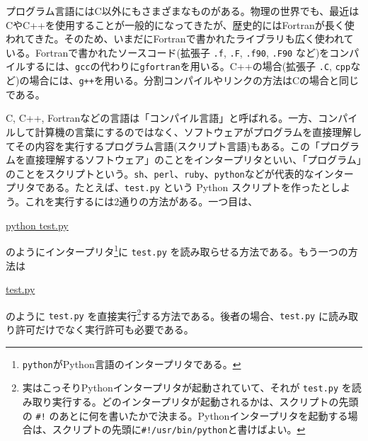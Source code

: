 プログラム言語にはC以外にもさまざまなものがある。物理の世界でも、最近はCやC++を使用することが一般的になってきたが、歴史的にはFortranが長く使われてきた。そのため、いまだにFortranで書かれたライブラリも広く使われている。Fortranで書かれたソースコード(拡張子 {\tt .f}, {\tt .F}, {\tt .f90}, {\tt .F90} など)をコンパイルするには、{\tt gcc}の代わりに{\tt gfortran}を用いる。C++の場合(拡張子 {\tt .C}, {\tt cpp}など)の場合には、{\tt g++}を用いる。分割コンパイルやリンクの方法はCの場合と同じである。

C, C++, Fortranなどの言語は「コンパイル言語」と呼ばれる。一方、コンパイルして計算機の言葉にするのではなく、ソフトウェアがプログラムを直接理解してその内容を実行するプログラム言語(スクリプト言語)もある。この「プログラムを直接理解するソフトウェア」のことをインタープリタといい、「プログラム」のことをスクリプトという。{\tt sh}、{\tt perl}、{\tt ruby}、{\tt python}などが代表的なインタープリタである。たとえば、{\tt test.py} という Python スクリプトを作ったとしよう。これを実行するには2通りの方法がある。一つ目は、
\begin{commandline2}
\prompt \underline{python test.py}
\end{commandline2} \noindent
のようにインタープリタ\footnote{{\tt python}がPython言語のインタープリタである。}に {\tt test.py} を読み取らせる方法である。もう一つの方法は
\begin{commandline2}
\prompt \underline{test.py}
\end{commandline2} \noindent
のように {\tt test.py} を直接実行\footnote{実はこっそりPythonインタープリタが起動されていて、それが {\tt test.py} を読み取り実行する。どのインタープリタが起動されるかは、スクリプトの先頭の {\tt \#!} のあとに何を書いたかで決まる。Pythonインタープリタを起動する場合は、スクリプトの先頭に{\tt \#!/usr/bin/python}と書けばよい。}する方法である。後者の場合、{\tt test.py} に読み取り許可だけでなく実行許可も必要である。


